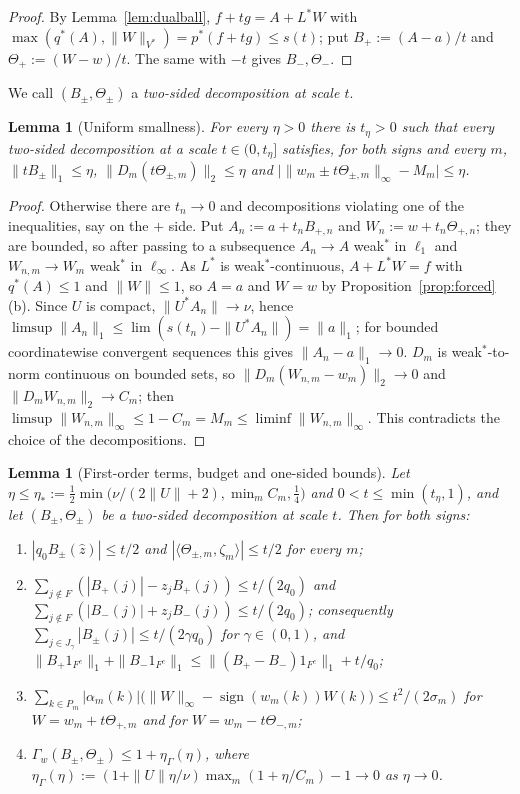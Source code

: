 \documentclass[10pt]{amsart}
\newtheorem{lemma}[theorem]{Lemma}
\theoremstyle{definition}
\theoremstyle{remark}
\newcommand{\sgn}{\operatorname{sign}}
\newcommand{\zh}{\hat z}
\newcommand{\ip}[2]{\langle #1,#2\rangle}
\begin{document}
\begin{proof}
By Lemma~\ref{lem:dualball}, $f+tg=A+L^*W$ with $\max(q^*(A),\|W\|_{V^*})=
p^*(f+tg)\le s(t)$; put $B_+:=(A-a)/t$ and $\Theta_+:=(W-w)/t$.  The same
with $-t$ gives $B_-,\Theta_-$.
\end{proof}

We call $(B_\pm,\Theta_\pm)$ a \emph{two-sided decomposition at scale $t$}.

\begin{lemma}[Uniform smallness]\label{lem:smallness}
For every $\eta>0$ there is $t_\eta>0$ such that every two-sided
decomposition at a scale $t\in(0,t_\eta]$ satisfies, for both signs and
every $m$, $\|tB_\pm\|_1\le\eta$, $\|D_m(t\Theta_{\pm,m})\|_2\le\eta$ and
$\big|\|w_m\pm t\Theta_{\pm,m}\|_\infty-M_m\big|\le\eta$.
\end{lemma}

\begin{proof}
Otherwise there are $t_n\to0$ and decompositions violating one of the
inequalities, say on the $+$ side.  Put $A_n:=a+t_nB_{+,n}$ and
$W_n:=w+t_n\Theta_{+,n}$; they are bounded, so after passing to a
subsequence $A_n\to A$ weak$^*$ in $\ell_1$ and $W_{n,m}\to W_m$ weak$^*$ in
$\ell_\infty$.  As $L^*$ is weak$^*$-continuous, $A+L^*W=f$ with
$q^*(A)\le1$ and $\|W\|\le1$, so $A=a$ and $W=w$ by
Proposition~\ref{prop:forced}(b).  Since $U$ is compact, $\|U^*A_n\|\to\nu$,
hence $\limsup\|A_n\|_1\le\lim(s(t_n)-\|U^*A_n\|)=\|a\|_1$; for bounded
coordinatewise convergent sequences this gives $\|A_n-a\|_1\to0$.  $D_m$ is
weak$^*$-to-norm continuous on bounded sets, so $\|D_m(W_{n,m}-w_m)\|_2\to0$
and $\|D_mW_{n,m}\|_2\to C_m$; then $\limsup\|W_{n,m}\|_\infty\le
1-C_m=M_m\le\liminf\|W_{n,m}\|_\infty$.  This contradicts the choice of the
decompositions.
\end{proof}

\begin{lemma}[First-order terms, budget and one-sided bounds]\label{lem:budget}
Let $\eta\le\eta_*:=\frac12\min\big(\nu/(2\|U\|+2),\min_mC_m,\frac14\big)$
and $0<t\le\min(t_\eta,1)$, and let $(B_\pm,\Theta_\pm)$ be a two-sided
decomposition at scale $t$.  Then for both signs:
\begin{enumerate}
\item[(a)] $|q_0B_\pm(\zh)|\le t/2$ and $|\ip{\Theta_{\pm,m}}{\zeta_m}|\le
t/2$ for every $m$;
\item[(b)] $\sum_{j\notin F}(|B_+(j)|-z_jB_+(j))\le t/(2q_0)$ and
$\sum_{j\notin F}(|B_-(j)|+z_jB_-(j))\le t/(2q_0)$; consequently
$\sum_{j\in J_\gamma}|B_\pm(j)|\le t/(2\gamma q_0)$ for $\gamma\in(0,1)$, and
$\|B_+1_{F^c}\|_1+\|B_-1_{F^c}\|_1\le\|(B_+-B_-)1_{F^c}\|_1+t/q_0$;
\item[(c)] $\sum_{k\in P_m}|\alpha_m(k)|\big(\|W\|_\infty-\sgn(w_m(k))W(k)
\big)\le t^2/(2\sigma_m)$ for $W=w_m+t\Theta_{+,m}$ and for
$W=w_m-t\Theta_{-,m}$;
\item[(d)] $\Gamma_w(B_\pm,\Theta_\pm)\le1+\eta_\Gamma(\eta)$, where
$\eta_\Gamma(\eta):=(1+\|U\|\eta/\nu)\max_m(1+\eta/C_m)-1\to0$ as $\eta\to0$.
\end{enumerate}
\end{lemma}
\end{document}
